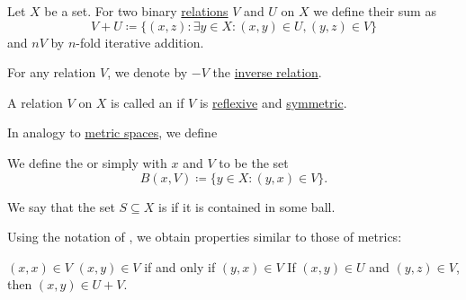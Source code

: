 \begin{definition}\label{def:entourage}
  Let \( X \) be a set. For two binary \hyperref[def:relation]{relations} \( V \) and \( U \) on \( X \) we define their sum as
  \begin{equation*}
    V + U \coloneqq \{ (x, z) \colon \exists y \in X: (x, y) \in U, (y, z) \in V \}
  \end{equation*}
  and \( nV \) by \( n \)-fold iterative addition.

  For any relation \( V \), we denote by \( -V \) the \hyperref[def:binary_relation/converse]{inverse relation}.

  A relation \( V \) on \( X \) is called an  if \( V \) is \hyperref[def:binary_relation/reflexive]{reflexive} and \hyperref[def:binary_relation/symmetric]{symmetric}.

  In analogy to \hyperref[def:metric_space]{metric spaces}, we define
  \begin{thmenum}
     We define the  or simply  with  \( x \) and  \( V \) to be the set
    \begin{equation*}
      B(x, V) \coloneqq \{ y \in X \colon (y, x) \in V \}.
    \end{equation*}

     We say that the set \( S \subseteq X \) is  if it is contained in some ball.
  \end{thmenum}
\end{definition}

\begin{proposition}\label{thm:entourage_simulates_metric}
  Using the notation of , we obtain properties similar to those of metrics:
  \begin{thmenum}
     \( (x, x) \in V \)
     \( (x, y) \in V \) if and only if \( (y, x) \in V \)
     If \( (x, y) \in U \) and \( (y, z) \in V \), then \( (x, y) \in U + V \).
  \end{thmenum}
\end{proposition}

